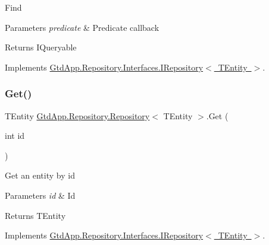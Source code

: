 Find 


\begin{DoxyParams}{Parameters}
{\em predicate} & Predicate callback\\
\hline
\end{DoxyParams}
\begin{DoxyReturn}{Returns}
I\+Queryable
\end{DoxyReturn}


Implements \mbox{\hyperlink{interface_gtd_app_1_1_repository_1_1_interfaces_1_1_i_repository_a2b79b76e74629fd46fdce7e4caf1760d}{Gtd\+App.\+Repository.\+Interfaces.\+I\+Repository$<$ T\+Entity $>$}}.

\mbox{\label{class_gtd_app_1_1_repository_1_1_repository_a95123d874c390a6707a12d17fd9b274b}} 
\subsubsection{\texorpdfstring{Get()}{Get()}}
{\footnotesize\ttfamily T\+Entity \mbox{\hyperlink{class_gtd_app_1_1_repository_1_1_repository}{Gtd\+App.\+Repository.\+Repository}}$<$ T\+Entity $>$.Get (\begin{DoxyParamCaption}\item[{int}]{id }\end{DoxyParamCaption})}



Get an entity by id 


\begin{DoxyParams}{Parameters}
{\em id} & Id\\
\hline
\end{DoxyParams}
\begin{DoxyReturn}{Returns}
T\+Entity
\end{DoxyReturn}


Implements \mbox{\hyperlink{interface_gtd_app_1_1_repository_1_1_interfaces_1_1_i_repository_a9f0a2115050565ee4984d43e9163f525}{Gtd\+App.\+Repository.\+Interfaces.\+I\+Repository$<$ T\+Entity $>$}}.

\mbox{\label{class_gtd_app_1_1_repository_1_1_repository_a63de411b4f50ec975c4a9db03ec36143}} 
